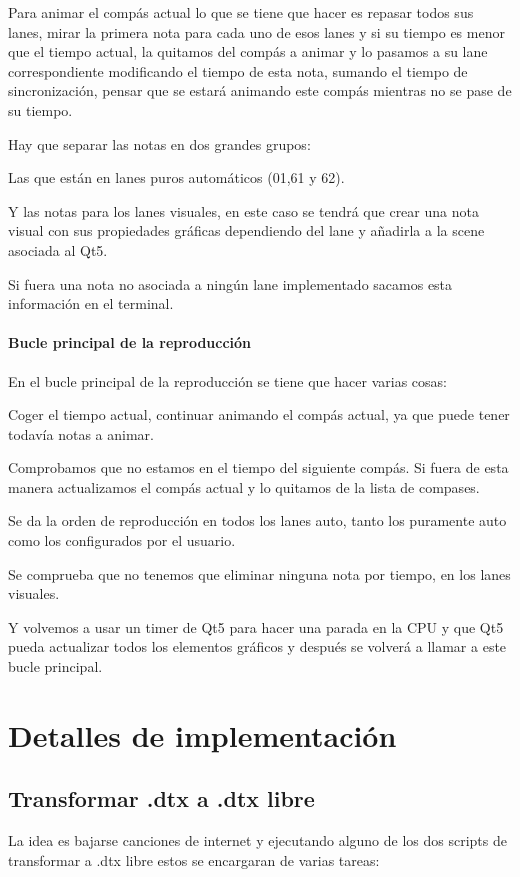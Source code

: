 \documentclass[a4paper,11pt,oneside]{book}
\begin{document}
Para animar el compás actual lo que se tiene que hacer es repasar todos sus lanes, mirar la primera nota para cada uno de esos lanes y si su tiempo es menor que el tiempo actual, la quitamos del compás a animar y lo pasamos a su lane correspondiente modificando el tiempo de esta nota, sumando el tiempo de sincronización, pensar que se estará animando este compás mientras no se pase de su tiempo.

Hay que separar las notas en dos grandes grupos:

Las que  están en lanes puros automáticos (01,61 y 62).

Y las notas para los lanes visuales, en este caso se tendrá que crear una nota visual con sus propiedades gráficas dependiendo del lane y añadirla a la scene asociada al Qt5.

Si fuera una nota no asociada a ningún lane implementado sacamos esta información en el terminal.

\subsubsection{Bucle principal de la reproducción}
En el bucle principal de la reproducción se tiene que hacer varias cosas:

Coger el tiempo actual, continuar animando el compás actual, ya que puede tener todavía notas a animar.

Comprobamos que no estamos en el tiempo del siguiente compás. Si fuera de esta manera actualizamos el compás actual y lo quitamos de la lista de compases.

Se da la orden de reproducción en todos los lanes auto, tanto los puramente auto como los configurados por el usuario.

Se comprueba que no tenemos que eliminar ninguna nota por tiempo, en los lanes visuales.

Y volvemos a usar un timer de Qt5 para hacer una parada en la CPU y que Qt5 pueda actualizar todos los elementos gráficos y después se volverá a llamar a este bucle principal.

\chapter{Detalles de implementación}
\section{Transformar .dtx a .dtx libre}

La idea es bajarse canciones de internet y ejecutando alguno de los dos scripts de transformar a .dtx libre estos se encargaran de varias tareas:
\end{document}
